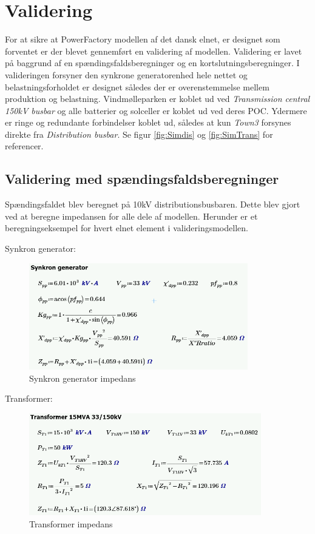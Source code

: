 
\label{Validering}
\section{Validering}

For at sikre at PowerFactory modellen af det dansk elnet, er designet som forventet er der blevet gennemført en validering af modellen. Validering er lavet på baggrund af en spændingsfaldsberegninger og en kortslutningsberegninger. I valideringen forsyner den synkrone generatorenhed hele nettet og belastningsforholdet er designet således der er overenstemmelse mellem produktion og belastning. Vindmølleparken er koblet ud ved \textit{Transmission central 150kV busbar} og alle batterier og solceller er koblet ud ved deres POC. Ydermere er ringe og redundante forbindelser koblet ud, således at kun \textit{Town3} forsynes direkte fra \textit{Distribution busbar}. Se figur \ref{fig:Simdis} og \ref{fig:SimTrans} for referencer.

\subsection{Validering med spændingsfaldsberegninger}
Spændingsfaldet blev beregnet på 10kV distributionsbusbaren. Dette blev gjort ved at beregne impedansen for alle dele af modellen. Herunder er et beregningseksempel for hvert elnet element i valideringsmodellen.

Synkron generator:
\begin{figure}[H] %
	\centering
	\includegraphics[width=0.85\textwidth]{figurer/Synkron_generator_validering}
	\caption{Synkron generator impedans}
	\label{fig:SGimpedans}
\end{figure}

Transformer:
\begin{figure}[H] %
	\centering
	\includegraphics[width=0.9\textwidth]{figurer/Transformer_validering}
	\caption{Transformer impedans}
	\label{fig:Trafoimpedans}
\end{figure}

